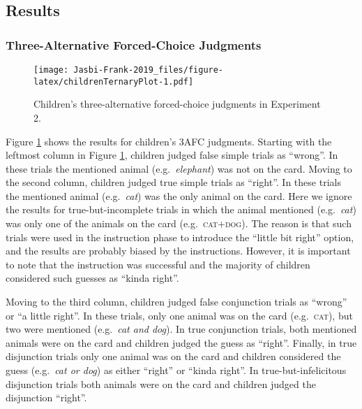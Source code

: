 \documentclass[
  english,
  ,man,floatsintext]{apa6}
\begin{document}
\hypertarget{results-1}{%
\subsection{Results}\label{results-1}}

\hypertarget{three-alternative-forced-choice-judgments}{%
\subsubsection{Three-Alternative Forced-Choice Judgments}\label{three-alternative-forced-choice-judgments}}

\begin{figure}
\centering
\texttt{[image: Jasbi-Frank-2019\_files/figure-latex/childrenTernaryPlot-1.pdf]}
\caption{\label{fig:childrenTernaryPlot}Children's three-alternative forced-choice judgments in Experiment 2.}
\end{figure}

Figure \ref{fig:childrenTernaryPlot} shows the results for children's 3AFC judgments. Starting with the leftmost column in Figure \ref{fig:childrenTernaryPlot}, children judged false simple trials as \enquote{wrong}. In these trials the mentioned animal (e.g.~\emph{elephant}) was not on the card. Moving to the second column, children judged true simple trials as \enquote{right}. In these trials the mentioned animal (e.g.~\emph{cat}) was the only animal on the card. Here we ignore the results for true-but-incomplete trials in which the animal mentioned (e.g.~\emph{cat}) was only one of the animals on the card (e.g.~\textsc{cat+dog}). The reason is that such trials were used in the instruction phase to introduce the \enquote{little bit right} option, and the results are probably biased by the instructions. However, it is important to note that the instruction was successful and the majority of children considered such guesses as \enquote{kinda right}.

Moving to the third column, children judged false conjunction trials as \enquote{wrong} or \enquote{a little right}. In these trials, only one animal was on the card (e.g.~\textsc{cat}), but two were mentioned (e.g.~\emph{cat and dog}). In true conjunction trials, both mentioned animals were on the card and children judged the guess as \enquote{right}. Finally, in true disjunction trials only one animal was on the card and children considered the guess (e.g.~\emph{cat or dog}) as either \enquote{right} or \enquote{kinda right}. In true-but-infelicitous disjunction trials both animals were on the card and children judged the disjunction \enquote{right}.
\end{document}
